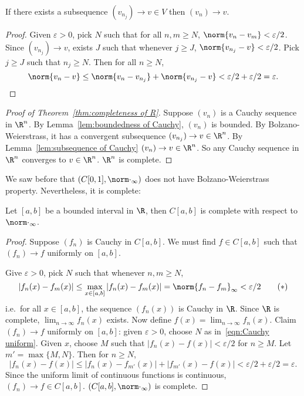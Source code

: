 \documentclass[a4paper]{article}
\theoremstyle{definition}
\begin{document}
\begin{lemma}
  \label{lem:subsequence of Cauchy}
  If there exists a subsequence \((v_{n_j}) \to v \in V\) then \((v_n) \to v\).
\end{lemma}

\begin{proof}
  Given \(\varepsilon > 0\), pick \(N\) such that for all \(n, m \geq N\), \(\norm{v_n - v_m} < \varepsilon/2\). Since \((v_{n_j}) \to v\), exists \(J\) such that whenever \(j \geq J\), \(\norm{v_{n_j} - v} < \varepsilon/2\). Pick \(j \geq J\) such that \(n_j \geq N\). Then for all \(n\geq N\),
  \[
    \norm{v_n - v} \leq \norm{v_n - v_{n_j}} + \norm{v_{n_j} - v} < \varepsilon/2 + \varepsilon/2 = \varepsilon.
  \]
\end{proof}

\begin{proof}[Proof of Theorem~\ref{thm:completeness of R}]
  Suppose \((v_n)\) is a Cauchy sequence in \(\R^n\). By Lemma~\ref{lem:boundedness of Cauchy}, \((v_n)\) is bounded. By Bolzano-Weierstrass, it has a convergent subsequence \((v_{n_j}) \to v \in \R^n\). By Lemma~\ref{lem:subsequence of Cauchy} \((v_n) \to v \in \R^n\). So any Cauchy sequence in \(\R^n\) converges to \(v\in \R^n\). \(\R^n\) is complete.
\end{proof}

We saw before that \((C[0, 1], \norm \cdot_\infty)\) does not have Bolzano-Weierstrass property. Nevertheless, it is complete:

\begin{theorem}
  Let \([a, b]\) be a bounded interval in \(\R\), then \(C[a, b]\) is complete with respect to \(\norm \cdot_\infty\).
\end{theorem}

\begin{proof}
  Suppose \((f_n)\) is Cauchy in \(C[a, b]\). We must find \(f\in C[a, b]\) such that \((f_n) \to f\) uniformly on \([a, b]\).

  Give \(\varepsilon > 0\), pick \(N\) such that whenever \(n,m \geq N\),
  \begin{equation}
    \label{eqn:Cauchy uniform}
    |f_n(x) - f_m(x)| \leq \max_{x \in [a,b]}|f_n(x) - f_m(x)| = \norm{f_n - f_m}_\infty < \varepsilon/2
    \tag{\(\ast\)}
  \end{equation}
  i.e.\ for all \(x \in [a, b]\), the sequence \((f_n(x))\) is Cauchy in \(\R\). Since \(\R\) is complete, \(\lim_{n \to \infty}f_n(x)\) exists. Now define \(f(x) = \lim_{n \to \infty}f_n(x)\). Claim \((f_n) \to f\) uniformly on \([a, b]\): given \(\varepsilon > 0\), choose \(N\) as in~\eqref{eqn:Cauchy uniform}. Given \(x\), choose \(M\) such that \(|f_n(x) - f(x)| < \varepsilon/2\) for \(n \geq M\). Let \(m' = \max\{M, N\}\). Then for \(n \geq N\),
  \[
    |f_n(x) - f(x)| \leq |f_n(x) - f_{m'}(x)| + |f_{m'}(x) - f(x)| < \varepsilon/2 + \varepsilon/2 = \varepsilon.
  \]
  Since the uniform limit of continuous functions is continuous, \((f_n) \to f \in C[a, b]\). \((C[a, b], \norm \cdot_\infty)\) is complete.
\end{proof}
\end{document}
